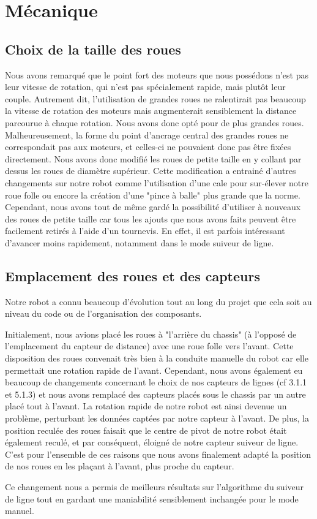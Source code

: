 \section{Mécanique}
\subsection{Choix de la taille des roues}

Nous avons remarqué que le point fort des moteurs que nous possédons n'est pas leur vitesse de rotation, qui n'est pas spécialement rapide, mais plutôt leur couple. Autrement dit, l'utilisation de grandes roues ne ralentirait pas beaucoup la vitesse de rotation des moteurs mais augmenterait sensiblement la distance parcourue à chaque rotation. Nous avons donc opté pour de plus grandes roues. Malheureusement, la forme du point d'ancrage central des grandes roues ne correspondait pas aux moteurs, et celles-ci ne pouvaient donc pas être fixées directement. Nous avons donc modifié les roues de petite taille en y collant par dessus les roues de diamètre supérieur. Cette modification a entrainé d'autres changements sur notre robot comme l'utilisation d'une cale pour sur-élever notre roue folle ou encore la création d'une "pince à balle" plus grande que la norme. Cependant, nous avons tout de même gardé la possibilité d'utiliser à nouveaux des roues de petite taille car tous les ajouts que nous avons faits peuvent être facilement retirés à l'aide d'un tournevis. En effet, il est parfois intéressant d'avancer moins rapidement, notamment dans le mode suiveur de ligne.

\subsection{Emplacement des roues et des capteurs}
Notre robot a connu beaucoup d'évolution tout au long du projet que cela soit au niveau du code ou de l'organisation des composants.

Initialement, nous avions placé les roues à "l'arrière du chassis" (à l'opposé de l'emplacement du capteur de distance) avec une roue folle vers l'avant. Cette disposition des roues convenait très bien à la conduite manuelle du robot car elle permettait une rotation rapide de l'avant. Cependant, nous avons également eu beaucoup de changements concernant le choix de nos capteurs de lignes (cf 3.1.1 et 5.1.3) et nous avons remplacé des capteurs placés sous le chassis par un autre placé tout à l'avant. La rotation rapide de notre robot est ainsi devenue un problème, perturbant les données captées par notre capteur à l'avant. De plus, la position reculée des roues faisait que le centre de pivot de notre robot était également reculé, et par conséquent, éloigné de notre capteur suiveur de ligne. C'est pour l'ensemble de ces raisons que nous avons finalement adapté la position de nos roues en les plaçant à l'avant, plus proche du capteur.

Ce changement nous a permis de meilleurs résultats sur l'algorithme du suiveur de ligne tout en gardant une maniabilité sensiblement inchangée pour le mode manuel.
